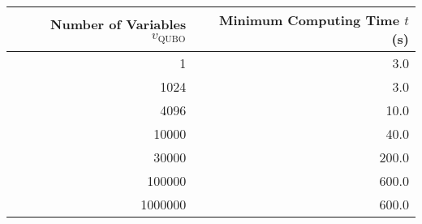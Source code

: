 \begin{tabular}{| r | r |}
  \hline
  Number of Variables $v_{\text{QUBO}}$ & Minimum Computing Time $t$ (s) \\
  \hline \hline
  1 & 3.0 \\
  \hline
  1024 & 3.0 \\
  \hline
  4096 & 10.0 \\
  \hline
  10000 & 40.0 \\
  \hline
  30000 & 200.0 \\
  \hline
  100000 & 600.0 \\
  \hline
  1000000 & 600.0 \\
  \hline
  \end{tabular}